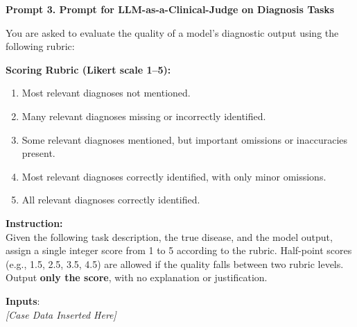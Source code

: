 \documentclass[10pt,journal,compsoc, onecolumn]{IEEEtran}
\begin{document}
\vspace{1em}

\clearpage
\vspace*{2.2cm}

\begin{baselinebox}
    \textbf{Prompt 3. Prompt for LLM-as-a-Clinical-Judge on Diagnosis Tasks}
    
    \vspace{1em}
    You are asked to evaluate the quality of a model’s diagnostic output using the following rubric:
    
    \vspace{1em}
    \textbf{Scoring Rubric (Likert scale 1–5):}
    \begin{enumerate}[label=\arabic*., leftmargin=*, noitemsep, topsep=2pt]
    \item Most relevant diagnoses not mentioned.
    \item Many relevant diagnoses missing or incorrectly identified.
    \item Some relevant diagnoses mentioned, but important omissions or inaccuracies present.
    \item Most relevant diagnoses correctly identified, with only minor omissions.
    \item All relevant diagnoses correctly identified.
    \end{enumerate}

    
    \vspace{1em}
    \textbf{Instruction:}\\
    Given the following task description, the true disease, and the model output, assign a single integer score from 1 to 5 according to the rubric. Half-point scores (e.g., 1.5, 2.5, 3.5, 4.5) are allowed if the quality falls between two rubric levels. Output \textbf{only the score}, with no explanation or justification.
    
    \vspace{1em}
    \textbf{Inputs}:\\
    \textit{[Case Data Inserted Here]}
\end{baselinebox}

\vspace{2em} %
\end{document}
